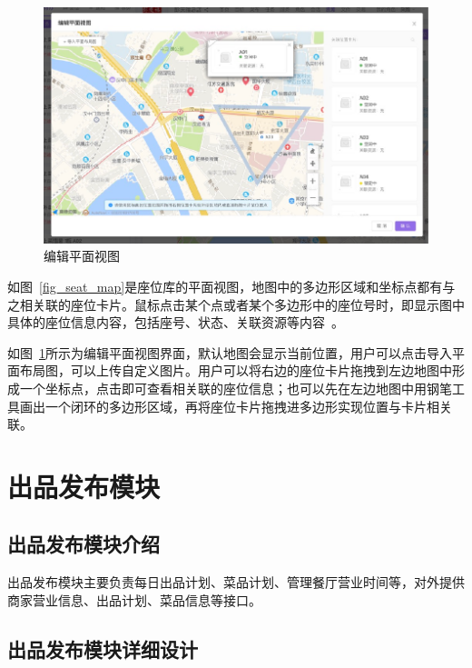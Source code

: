 \begin{figure}[htbp!]
    \centering
    \includegraphics[width=5in]{FIGs/chapter4/seat_map_edit.pdf}
    \caption{编辑平面视图}\label{fig_seat_map_edit}
\end{figure}

如图~\ref{fig_seat_map}是座位库的平面视图，地图中的多边形区域和坐标点都有与之相关联的座位卡片。鼠标点击某个点或者某个多边形中的座位号时，即显示图中具体的座位信息内容，包括座号、状态、关联资源等内容~\cite{wzz2016}。

如图~\ref{fig_seat_map_edit}所示为编辑平面视图界面，默认地图会显示当前位置，用户可以点击导入平面布局图，可以上传自定义图片。用户可以将右边的座位卡片拖拽到左边地图中形成一个坐标点，点击即可查看相关联的座位信息；也可以先在左边地图中用钢笔工具画出一个闭环的多边形区域，再将座位卡片拖拽进多边形实现位置与卡片相关联。\\

\section{出品发布模块}
\subsection{出品发布模块介绍}
出品发布模块主要负责每日出品计划、菜品计划、管理餐厅营业时间等，对外提供商家营业信息、出品计划、菜品信息等接口。\\

\subsection{出品发布模块详细设计}

